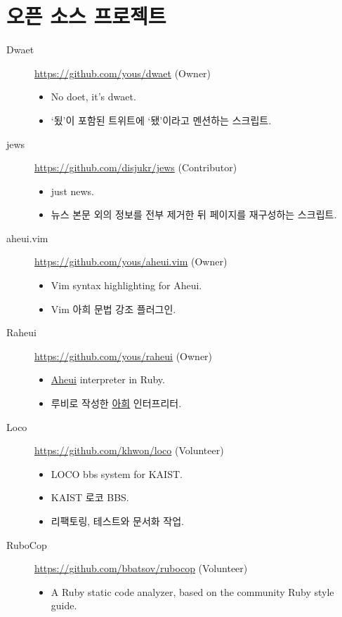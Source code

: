 \documentclass[a4paper,10pt]{article}
\begin{document}
\section{오픈 소스 프로젝트}
\begin{description}
  \item[Dwaet] \url{https://github.com/yous/dwaet} (Owner)
    \begin{itemize}
      \item No doet, it's dwaet.
      \item `됬'이 포함된 트위트에 `됐'이라고 멘션하는 스크립트.
    \end{itemize}
  \item[jews] \url{https://github.com/disjukr/jews} (Contributor)
    \begin{itemize}
      \item just news.
      \item 뉴스 본문 외의 정보를 전부 제거한 뒤 페이지를 재구성하는 스크립트.
    \end{itemize}
  \item[aheui.vim] \url{https://github.com/yous/aheui.vim} (Owner)
    \begin{itemize}
      \item Vim syntax highlighting for Aheui.
      \item Vim 아희 문법 강조 플러그인.
    \end{itemize}
  \item[Raheui] \url{https://github.com/yous/raheui} (Owner)
    \begin{itemize}
      \item \href{http://aheui.github.io}{Aheui} interpreter in Ruby.
      \item 루비로 작성한 \href{http://aheui.github.io}{아희} 인터프리터.
    \end{itemize}
  \item[Loco] \url{https://github.com/khwon/loco} (Volunteer)
    \begin{itemize}
      \item LOCO bbs system for KAIST.
      \item KAIST 로코 BBS.
      \item 리팩토링, 테스트와 문서화 작업.
    \end{itemize}
  \item[RuboCop] \url{https://github.com/bbatsov/rubocop} (Volunteer)
    \begin{itemize}
      \item A Ruby static code analyzer, based on the community Ruby style guide.

\end{itemize}
\end{description}
\end{document}
